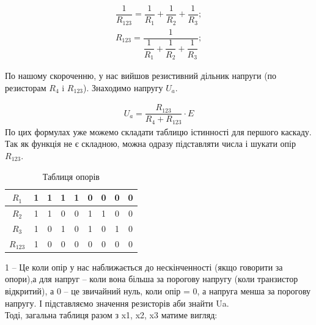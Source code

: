 \documentclass[a4paper,14pt]{extreport}
\begin{document}
  \begin{align}
    \dfrac{1}{R_{123}} = \dfrac{1}{R_{1}}+\dfrac{1}{R_{2}} + \dfrac{1}{R_3};\\
    R_{123} = \dfrac{1}{\dfrac{1}{R_{1}}+\dfrac{1}{R_{2}} + \dfrac{1}{R_3}};
  \end{align}


  \clearpage
  По нашому скороченню, у нас вийшов резистивний дільник напруги (по резисторам $R_{4}$ i $R_{123}$). Знаходимо напругу $U_a$.

  \begin{align}
    U_a = \dfrac{R_{123}}{R_{4} + R_{123}} \cdot E
  \end{align}
  По цих формулах уже можемо складати таблицю істинності для першого каскаду. Так як функція не є складною, можна одразу підставляти числа і шукати опір $R_{123}$.

  \begin{table}[h]
  \caption{Таблиця опорів}
    \begin{center}
      \begin{tabular}{|c|c|c|c|c|c|c|c|c|}
      \hline
      $R_1 $  & 1 & 1 & 1 & 1 & 0 & 0 & 0 & 0 \\ \hline
      $R_2 $  & 1 & 1 & 0 & 0 & 1 & 1 & 0 & 0 \\ \hline
      $R_3 $  & 1 & 0 & 1 & 0 & 1 & 0 & 1 & 0 \\ \hline
  $R_{123} $  & 1 & 0 & 0 & 0 & 0 & 0 & 0 & 0\\ \hline
      \end{tabular}
    \end{center}
  \end{table}

  1 – Це коли опір у нас наближається до нескінченності (якщо говорити за опори),а для напруг – коли вона більша за порогову напругу (коли транзистор відкритий), а 0 – це звичайний нуль, коли опір = 0, а напруга менша за порогову напругу. І підставляємо значення резисторів аби знайти Ua.\\

  Тоді, загальна таблиця разом з x1, x2, x3 матиме вигляд:
\end{document}
